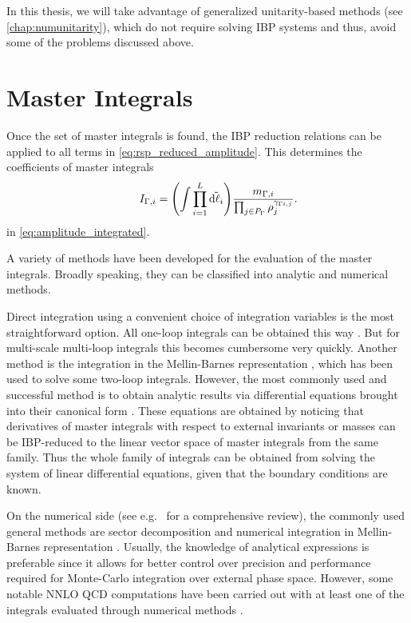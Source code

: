 In this thesis, we will take advantage of generalized unitarity-based methods (see \cref{chap:numunitarity}),
which do not require solving IBP systems and thus,
avoid some of the problems discussed above.

\section{Master Integrals}

Once the set of master integrals is found, the IBP reduction relations can be applied 
to all terms in \cref{eq:rsp_reduced_amplitude}.
This determines the coefficients of master integrals
\begin{equation} \label{eq:master_integrals}
    \qquad I_{\Gamma,i} = 
    \qty(\int \prod_{i=1}^{L} \tilde{\dd{\ell_i}}) \frac{m_{\Gamma,i}}{\prod_{j\in P_\Gamma} \rho_j^{\gamma_{\Gamma i,j}}}.
\end{equation}
in \cref{eq:amplitude_integrated}.

A variety of methods have been developed for the evaluation of the master integrals.
Broadly speaking, they can be classified into analytic and numerical methods.

Direct integration using a convenient choice of integration variables is the most straightforward option.
All one-loop integrals can be obtained this way \cite{vanHameren:2010cp,Ellis:2007qk,tHooft:1978jhc,Denner:2010tr}.
But for multi-scale multi-loop integrals this becomes  cumbersome   very quickly.
Another method is the integration in the Mellin-Barnes  representation  \cite{Smirnov:1999gc,Tausk:1999vh,Dubovyk:2017cqw}, which
has been used to solve some two-loop integrals.
However, the most commonly used and successful method is to obtain analytic results via
differential equations \cite{Kotikov:1990kg,Remiddi:1997ny,Gehrmann:1999as,Henn:2013pwa,Argeri:2007up,Henn:2014qga}
brought into their canonical form \cite{Henn:2013pwa}.
These equations are obtained by noticing that
derivatives of master integrals with respect to
external invariants or masses can be IBP-reduced to the linear vector space of master integrals from the same family.
Thus the whole family of integrals can be obtained from solving the system of linear differential equations,
given that the boundary conditions are known.

On the numerical side (see e.g.\ \cite{Freitas:2016sty} for a comprehensive review),
the commonly used general methods are sector decomposition \cite{Binoth:2000ps,Binoth:2003ak}
and numerical integration in Mellin-Barnes representation \cite{Czakon:2005rk,Anastasiou:2005cb}.
Usually, the knowledge of analytical expressions is preferable since it allows for better control over
precision and performance required for Monte-Carlo integration over external phase space. However,
some notable NNLO QCD computations have been carried out with at least one of the integrals evaluated through numerical
methods \cite{Jones:2018hbb,Grazzini:2018bsd,Baglio:2018lrj}.

